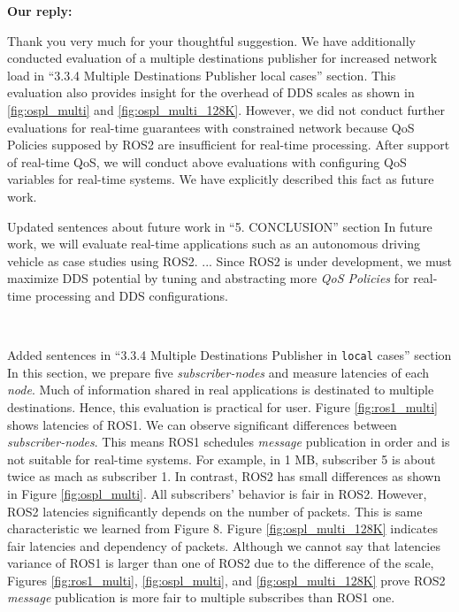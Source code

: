 \documentclass{article}
\begin{document}
\begin{enumerate}
  \begin{flushleft}
    \textbf{Our reply:}
  \end{flushleft}
  Thank you very much for your thoughtful suggestion.
  We have additionally conducted evaluation of a multiple destinations publisher for increased network load in ``3.3.4 Multiple Destinations Publisher local cases'' section.
  This evaluation also provides insight for the overhead of DDS scales as shown in \ref{fig:ospl_multi} and \ref{fig:ospl_multi_128K}.
  However, we did not conduct further evaluations for real-time guarantees with constrained network because QoS Policies supposed by ROS2 are insufficient for real-time processing.
  After support of real-time QoS, we will conduct above evaluations with configuring QoS variables for real-time systems.
  We have explicitly described this fact as future work.
  \begin{itembox}[|]{Updated sentences about future work in ``5. CONCLUSION'' section}
    In future work, we will evaluate real-time applications such as an autonomous driving vehicle as case studies using ROS2. 
    ...
    Since ROS2 is under development, we must maximize DDS potential by tuning and abstracting more \emph{QoS Policies} for real-time processing and DDS configurations.
  \end{itembox}\\
  \begin{itembox}[|]{Added sentences in ``3.3.4 Multiple Destinations Publisher in \texttt{local} cases'' section}
    In this section, we prepare five \emph{subscriber-nodes} and measure latencies of each \emph{node}.
    Much of information shared in real applications is destinated to multiple destinations.
    Hence, this evaluation is practical for user.
    Figure \ref{fig:ros1_multi} shows latencies of ROS1.
    We can observe significant differences between \emph{subscriber-nodes}.
    This means ROS1 schedules \emph{message} publication in order and is not suitable for real-time systems.
    For example, in 1 MB, subscriber 5 is about twice as mach as subscriber 1.
    In contrast, ROS2 has small differences as shown in Figure \ref{fig:ospl_multi}.
    All subscribers' behavior is fair in ROS2.
    However, ROS2 latencies significantly depends on the number of packets.
    This is same characteristic we learned from Figure 8.
    Figure \ref{fig:ospl_multi_128K} indicates fair latencies and dependency of packets.
    Although we cannot say that latencies variance of ROS1 is larger than one of ROS2 due to the difference of the scale, Figures \ref{fig:ros1_multi}, \ref{fig:ospl_multi}, and \ref{fig:ospl_multi_128K} prove ROS2 \emph{message} publication is more fair to multiple subscribes than ROS1 one.

\end{itembox}
\end{enumerate}
\end{document}
